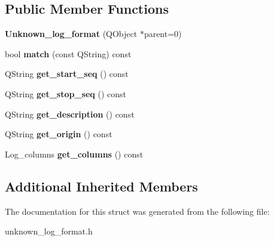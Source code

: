 \subsection*{Public Member Functions}
\begin{DoxyCompactItemize}
\item 
\hypertarget{struct_log__viewer_1_1_unknown__log__format_aad8ef2abb60df94f8c08187580069378}{{\bfseries Unknown\-\_\-log\-\_\-format} (Q\-Object $\ast$parent=0)}\label{struct_log__viewer_1_1_unknown__log__format_aad8ef2abb60df94f8c08187580069378}

\item 
\hypertarget{struct_log__viewer_1_1_unknown__log__format_abf1148548bdeab6abdb08271ca1299fd}{bool {\bfseries match} (const Q\-String) const }\label{struct_log__viewer_1_1_unknown__log__format_abf1148548bdeab6abdb08271ca1299fd}

\item 
\hypertarget{struct_log__viewer_1_1_unknown__log__format_abc19c19826203db3f7f66e12eccbba38}{Q\-String {\bfseries get\-\_\-start\-\_\-seq} () const }\label{struct_log__viewer_1_1_unknown__log__format_abc19c19826203db3f7f66e12eccbba38}

\item 
\hypertarget{struct_log__viewer_1_1_unknown__log__format_a09f98a3a65d8e77bdca6221695192350}{Q\-String {\bfseries get\-\_\-stop\-\_\-seq} () const }\label{struct_log__viewer_1_1_unknown__log__format_a09f98a3a65d8e77bdca6221695192350}

\item 
\hypertarget{struct_log__viewer_1_1_unknown__log__format_a72e95127f494c1a3929616992fe1db87}{Q\-String {\bfseries get\-\_\-description} () const }\label{struct_log__viewer_1_1_unknown__log__format_a72e95127f494c1a3929616992fe1db87}

\item 
\hypertarget{struct_log__viewer_1_1_unknown__log__format_a02e90d395641c589b9d8d4f07e095fbd}{Q\-String {\bfseries get\-\_\-origin} () const }\label{struct_log__viewer_1_1_unknown__log__format_a02e90d395641c589b9d8d4f07e095fbd}

\item 
\hypertarget{struct_log__viewer_1_1_unknown__log__format_ae3d72f0462bbcaecb8d1979db6844427}{Log\-\_\-columns {\bfseries get\-\_\-columns} () const }\label{struct_log__viewer_1_1_unknown__log__format_ae3d72f0462bbcaecb8d1979db6844427}

\end{DoxyCompactItemize}
\subsection*{Additional Inherited Members}


The documentation for this struct was generated from the following file\-:\begin{DoxyCompactItemize}
\item 
unknown\-\_\-log\-\_\-format.\-h\end{DoxyCompactItemize}
